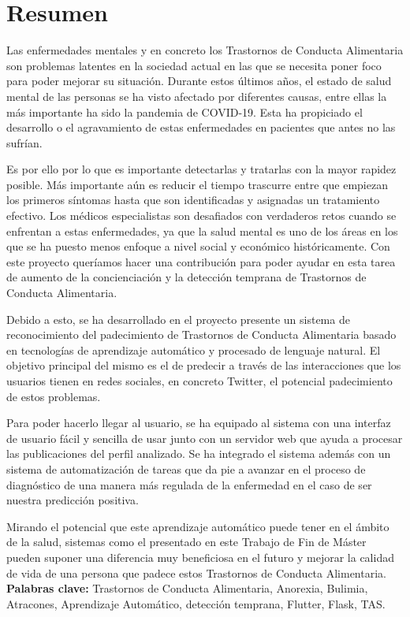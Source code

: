 \cleardoublepage
{}
\chapter*{Resumen}

Las enfermedades mentales y en concreto los Trastornos de Conducta Alimentaria son problemas latentes en la sociedad actual en las que se necesita poner foco para poder mejorar su situación. Durante estos últimos años, el estado de salud mental de las personas se ha visto afectado por diferentes causas, entre ellas la más importante ha sido la pandemia de COVID-19. Esta ha propiciado el desarrollo o el agravamiento de estas enfermedades en pacientes que antes no las sufrían.

Es por ello por lo que es importante detectarlas y tratarlas con la mayor rapidez posible. Más importante aún es reducir el tiempo trascurre entre que empiezan los primeros síntomas hasta que son identificadas y asignadas un tratamiento efectivo. Los médicos especialistas son desafiados con verdaderos retos cuando se enfrentan a estas enfermedades, ya que la salud mental es uno de los áreas en los que se ha puesto menos enfoque a nivel social y económico históricamente. Con este proyecto queríamos hacer una contribución para poder ayudar en esta tarea de aumento de la concienciación y la detección temprana de Trastornos de Conducta Alimentaria.

Debido a esto, se ha desarrollado en el proyecto presente un sistema de reconocimiento del padecimiento de Trastornos de Conducta Alimentaria basado en tecnologías de aprendizaje automático y procesado de lenguaje natural. El objetivo principal del mismo es el de predecir a través de las interacciones que los usuarios tienen en redes sociales, en concreto Twitter, el potencial padecimiento de estos problemas.

Para poder hacerlo llegar al usuario, se ha equipado al sistema con una interfaz de usuario fácil y sencilla de usar junto con un servidor web que ayuda a procesar las publicaciones del perfil analizado. Se ha integrado el sistema además con un sistema de automatización de tareas que da pie a avanzar en el proceso de diagnóstico de una manera más regulada de la enfermedad en el caso de ser nuestra predicción positiva.

Mirando el potencial que este aprendizaje automático puede tener en el ámbito de la salud, sistemas como el presentado en este Trabajo de Fin de Máster pueden suponer una diferencia muy beneficiosa en el futuro y mejorar la calidad de vida de una persona que padece estos Trastornos de Conducta Alimentaria.
\vfill
\textbf{Palabras clave:} Trastornos de Conducta Alimentaria, Anorexia, Bulimia, Atracones, Aprendizaje Automático, detección temprana, Flutter, Flask, TAS.